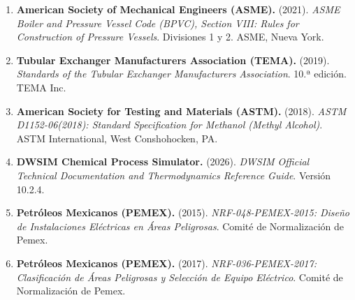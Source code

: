 \documentclass[10pt,letterpaper]{article}
\begin{document}
\begin{enumerate}[leftmargin=*]
    \item \textbf{American Society of Mechanical Engineers (ASME).} (2021). \textit{ASME Boiler and Pressure Vessel Code (BPVC), Section VIII: Rules for Construction of Pressure Vessels}. Divisiones 1 y 2. ASME, Nueva York.
    \item \textbf{Tubular Exchanger Manufacturers Association (TEMA).} (2019). \textit{Standards of the Tubular Exchanger Manufacturers Association}. 10.ª edición. TEMA Inc.
    \item \textbf{American Society for Testing and Materials (ASTM).} (2018). \textit{ASTM D1152-06(2018): Standard Specification for Methanol (Methyl Alcohol)}. ASTM International, West Conshohocken, PA.
    \item \textbf{DWSIM Chemical Process Simulator.} (2026). \textit{DWSIM Official Technical Documentation and Thermodynamics Reference Guide}. Versión 10.2.4.
    \item \textbf{Petróleos Mexicanos (PEMEX).} (2015). \textit{NRF-048-PEMEX-2015: Diseño de Instalaciones Eléctricas en Áreas Peligrosas}. Comité de Normalización de Pemex.
    \item \textbf{Petróleos Mexicanos (PEMEX).} (2017). \textit{NRF-036-PEMEX-2017: Clasificación de Áreas Peligrosas y Selección de Equipo Eléctrico}. Comité de Normalización de Pemex.
\end{enumerate}
\end{document}
